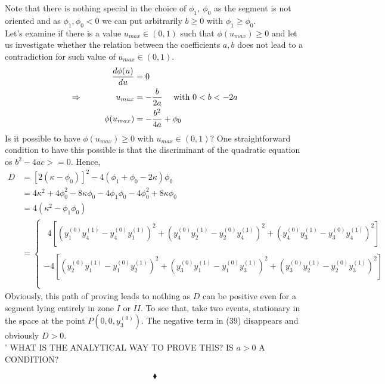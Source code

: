 Note that there is nothing special in the choice of $\phi_1, \ \phi_0$ as the segment is not oriented and as $\phi_1,\phi_0 <0$ we can put arbitrarily $b \geq0$ with $\phi_1 \geq \phi_0$.\\ 
Let's examine if there is a value $u_{max} \in (0,1)$ such that $\phi(u_{max})\geq 0$ and let us investigate whether the relation between the coefficients $a,b$ does not lead to a contradiction for such value of $u_{max} \in (0,1)$.  
\begin{align}
\dv{\phi(u)}{u}&=0\\
\Rightarrow\quad\quad\quad\quad u_{max} &= -\frac{b}{2a}\quad\text{ with } 0<b < -2a\\
\phi(u_{max}) &= -\frac{b^2}{4a}+\phi_0
\end{align}
Is it possible to have $\phi(u_{max}) \geq 0$ with $u_{max} \in (0,1)$? One straightforward condition to have this possible is that the discriminant of the quadratic equation os $b^2-4ac>=0$.
Hence,
\begin{align}
D &= \left[2 \left(\kappa- \phi_0\right)\right]^2-4\left(\phi_1 +\phi_0-2\kappa\right)\phi_0\\
&= 4\kappa^2+ 4\phi_0^2-8\kappa\phi_0-4\phi_1\phi_0 -4\phi_0^2+8\kappa\phi_0\\
&= 4\left(\kappa^2-\phi_1\phi_0\right)\\
&= \left\{\begin{array}{l} \ \ 
4\left[\left(y_1^{(0)}y_4^{(1)}-y_4^{(0)}y_1^{(1)}\right)^2
+\left(y_4^{(0)}y_2^{(1)}-y_2^{(0)}y_4^{(1)}\right)^2
+\left(y_4^{(0)}y_3^{(1)}-y_3^{(0)}y_4^{(1)}\right)^2\right]\\\\
-4\left[\left(y_2^{(0)}y_1^{(1)}-y_1^{(0)}y_2^{(1)}\right)^2
+\left(y_3^{(0)}y_1^{(1)}-y_1^{(0)}y_3^{(1)}\right)^2
+\left(y_3^{(0)}y_2^{(1)}-y_2^{(0)}y_3^{(1)}\right)^2\right]\\\\
\end{array}\right.
\end{align}
Obviously, this path of proving leads to nothing as $D$ can be positive even for a segment lying entirely in zone $I$ or $II$. To see that, take two events, stationary in  the space  at the point $P\left(0,0,y_3^{(0)}\right)$. The negative term in (39) disappears and obviously $D>0$.\\'
WHAT IS THE ANALYTICAL WAY TO PROVE THIS? IS $a>0$ A CONDITION?
\begin{comment}
\begin{figure}[H]

\caption{Travelling between two points in region III (present) in a  $V_3$ space-time manifold}
\label{fig:fig_p96_3415_b}
\end{figure}
\end{comment}
$$\blacklozenge$$
\newpage


